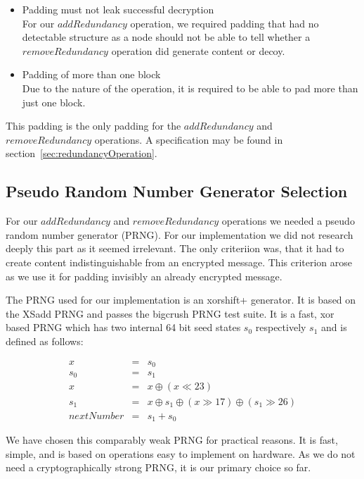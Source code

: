 \begin{itemize}
	\item Padding must not leak successful decryption\\
	      For our $addRedundancy$ operation, we required padding that had no detectable structure as a node should not be able to tell whether a $removeRedundancy$ operation did generate content or decoy. 
	\item Padding of more than one block\\
	Due to the nature of the operation, it is required to be able to pad more than just one block.
\end{itemize}

This padding is the only padding for the $addRedundancy$ and $removeRedundancy$ operations. A specification may be found in section~\ref{sec:redundancyOperation}.

\subsection{Pseudo Random Number Generator Selection\label{sec:prng}}
For our $addRedundancy$ and $removeRedundancy$ operations we needed a pseudo random number generator (PRNG). For our implementation we did not research deeply this part as it seemed irrelevant. The only criteriion was, that it had to create content indistinguishable from an encrypted message. This criterion arose as we use it for padding invisibly an already encrypted message.

The PRNG used for our implementation is an xorshift+ generator. It is based on the XSadd PRNG\cite{marsaglia2003xorshift} and passes the bigcrush PRNG test suite. It is a fast, xor based PRNG which has two internal 64 bit seed states $s_0$ respectively $s_1$ and is defined as follows:

\begin{eqnarray}
x & = & s_0\\
s_0 & = & s_1\\
x & = & x \oplus ( x \ll 23 )\\
s_1 & = & x \oplus s_1 \oplus ( x \gg 17 ) \oplus (s_1 \gg 26 )\\
nextNumber & = & s_1+s_0
\end{eqnarray}

We have chosen this comparably weak PRNG for practical reasons. It is fast, simple, and is based on operations easy to implement on hardware. As we do not need a cryptographically strong PRNG, it is our primary choice so far. 

